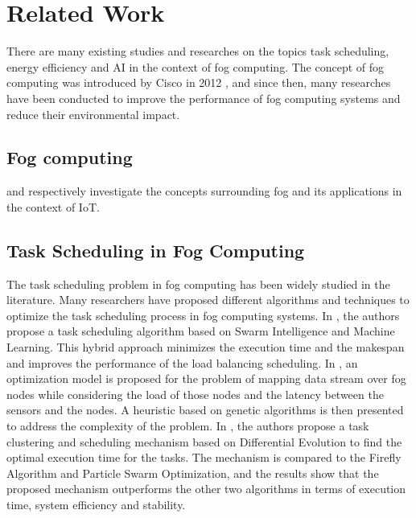 \chapter*{Related Work}
\label{chap:relatedwork}

There are many existing studies and researches on the topics task scheduling, energy efficiency and AI in the context
of fog computing. The concept of fog computing was introduced by Cisco in 2012 \cite{bonomi_et_al_2012}, and since
then, many researches have been conducted to improve the performance of fog computing systems and reduce their
environmental impact.

\section*{Fog computing}

\cite{rana_abubacker_2023} and \cite{abubacker_et_al_2023} respectively investigate the concepts surrounding fog
and its applications in the context of IoT.

\section*{Task Scheduling in Fog Computing}

The task scheduling problem in fog computing has been widely studied in the literature. Many researchers have proposed
different algorithms and techniques to optimize the task scheduling process in fog computing systems. In
\cite{rjoub_bentahar_2017}, the authors propose a task scheduling algorithm based on Swarm Intelligence and Machine
Learning. This hybrid approach minimizes the execution time and the makespan and improves the performance of the load
balancing scheduling. In \cite{canali_lancellotti_2019}, an optimization model is proposed for the problem of mapping
data stream over fog nodes while considering the load of those nodes and the latency between the sensors and the nodes.
A heuristic based on genetic algorithms is then presented to address the complexity of the problem. In
\cite{yousif_et_al_2024}, the authors propose a task clustering and scheduling mechanism based on Differential
Evolution to find the optimal execution time for the tasks. The mechanism is compared to the Firefly Algorithm and
Particle Swarm Optimization, and the results show that the proposed mechanism outperforms the other two algorithms in
terms of execution time, system efficiency and stability.

